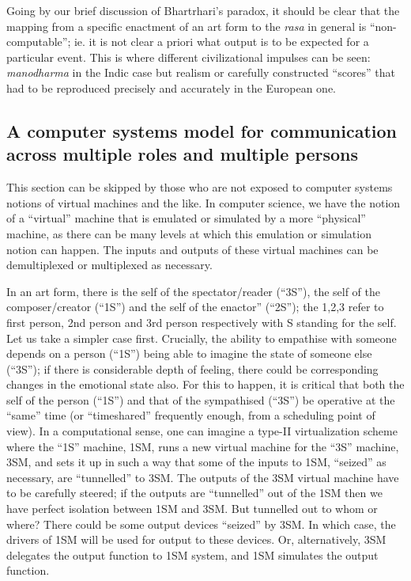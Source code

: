Going by our brief discussion of Bhartrhari’s paradox, it should be clear that the mapping from a specific enactment of an art form to the \textsl{rasa} in general is “non-computable”; ie. it is not clear a priori what output is to be expected for a particular event. This is where different civilizational impulses can be seen: \textsl{manodharma} in the Indic case but realism or carefully constructed “scores” that had to be reproduced precisely and accurately in the European one. 

\subsection{A computer systems model for communication across multiple roles and multiple persons}\label{chap3-sec4.2}

This section can be skipped by those who are not exposed to computer systems notions of virtual machines and the like. In computer science, we have the notion of a “virtual” machine that is emulated or simulated by a more “physical” machine, as there can be many levels at which this emulation or simulation notion can happen. The inputs and outputs of these virtual machines can be demultiplexed or multiplexed as necessary.

In an art form, there is the self of the spectator/reader (“3S”), the self of the composer/creator (“1S”) and the self of the enactor” (“2S”); the 1,2,3 refer to first person, 2nd person and 3rd person respectively with S standing for the self. Let us take a simpler case first. Crucially, the ability to empathise with someone depends on a person (“1S”) being able to imagine the state of someone else (“3S”); if there is considerable depth of feeling, there could be corresponding changes in the emotional state also. For this to happen, it is critical that both the self of the person (“1S”) and that of the sympathised (“3S”) be operative at the “same” time (or “timeshared” frequently enough, from a scheduling point of view). In a computational sense, one can imagine a type-II virtualization scheme where the “1S” machine, 1SM, runs a new virtual machine for the “3S” machine, 3SM, and sets it up in such a way that some of the inputs to 1SM, “seized” as necessary, are “tunnelled” to 3SM. The outputs of the 3SM virtual machine have to be carefully steered; if the outputs are “tunnelled” out of the 1SM then we have perfect isolation between 1SM and 3SM. But tunnelled out to whom or where? There could be some output devices “seized” by 3SM. In which case, the drivers of 1SM will be used for output to these devices. Or, alternatively, 3SM delegates the output function to 1SM system, and 1SM simulates the output function.

